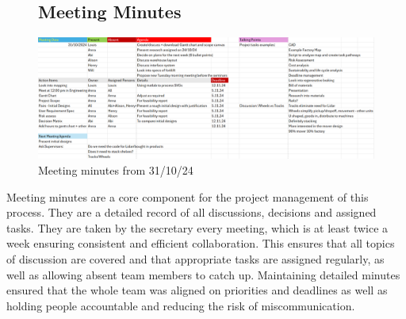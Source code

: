 \documentclass[12pt]{article}
\begin{document}
\begin{figure}[h!]
 \subsection{Meeting Minutes}
    \includegraphics[width=1\textwidth]{HalloweenMinutes1.png}
    \caption{Meeting minutes from 31/10/24}
    \label{fig:x}
\end{figure}
  
Meeting minutes are a core component for the project management of this process. They are a detailed record of all discussions, decisions and assigned tasks. They are taken by the secretary every meeting, which is at least twice a week ensuring consistent and efficient collaboration. This ensures that all topics of discussion are covered and that appropriate tasks are assigned regularly, as well as allowing absent team members to catch up. Maintaining detailed minutes ensured that the whole team was aligned on priorities and deadlines as well as holding people accountable and reducing the risk of miscommunication.
\end{document}
